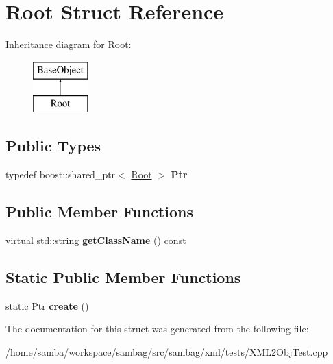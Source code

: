 \hypertarget{struct_root}{
\section{Root Struct Reference}
\label{struct_root}
}
Inheritance diagram for Root:\begin{figure}[H]
\begin{center}
\leavevmode
\includegraphics[height=2.000000cm]{struct_root}
\end{center}
\end{figure}
\subsection*{Public Types}
\begin{DoxyCompactItemize}
\item 
\hypertarget{struct_root_ac88e2fc9ec740e51c91f1b2991972cbd}{
typedef boost::shared\_\-ptr$<$ \hyperlink{struct_root}{Root} $>$ {\bfseries Ptr}}
\label{struct_root_ac88e2fc9ec740e51c91f1b2991972cbd}

\end{DoxyCompactItemize}
\subsection*{Public Member Functions}
\begin{DoxyCompactItemize}
\item 
\hypertarget{struct_root_af6da62aa054c938eaac301d5847fb9b7}{
virtual std::string {\bfseries getClassName} () const }
\label{struct_root_af6da62aa054c938eaac301d5847fb9b7}

\end{DoxyCompactItemize}
\subsection*{Static Public Member Functions}
\begin{DoxyCompactItemize}
\item 
\hypertarget{struct_root_ae770a0682c207a6c949ebd5051f9a044}{
static Ptr {\bfseries create} ()}
\label{struct_root_ae770a0682c207a6c949ebd5051f9a044}

\end{DoxyCompactItemize}


The documentation for this struct was generated from the following file:\begin{DoxyCompactItemize}
\item 
/home/samba/workspace/sambag/src/sambag/xml/tests/XML2ObjTest.cpp\end{DoxyCompactItemize}
